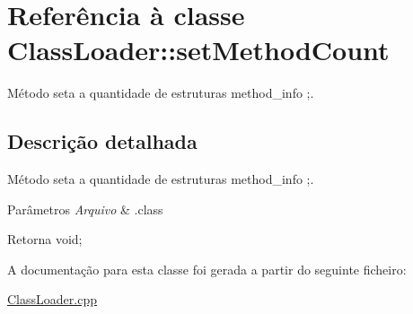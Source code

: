 \hypertarget{class_class_loader_1_1set_method_count}{}\section{Referência à classe Class\+Loader\+:\+:set\+Method\+Count}
\label{class_class_loader_1_1set_method_count}


Método seta a quantidade de estruturas method\+\_\+info ;.  




\subsection{Descrição detalhada}
Método seta a quantidade de estruturas method\+\_\+info ;. 


\begin{DoxyParams}{Parâmetros}
{\em Arquivo} & .class \\
\hline
\end{DoxyParams}
\begin{DoxyReturn}{Retorna}
void; 
\end{DoxyReturn}


A documentação para esta classe foi gerada a partir do seguinte ficheiro\+:\begin{DoxyCompactItemize}
\item 
\hyperlink{_class_loader_8cpp}{Class\+Loader.\+cpp}\end{DoxyCompactItemize}
